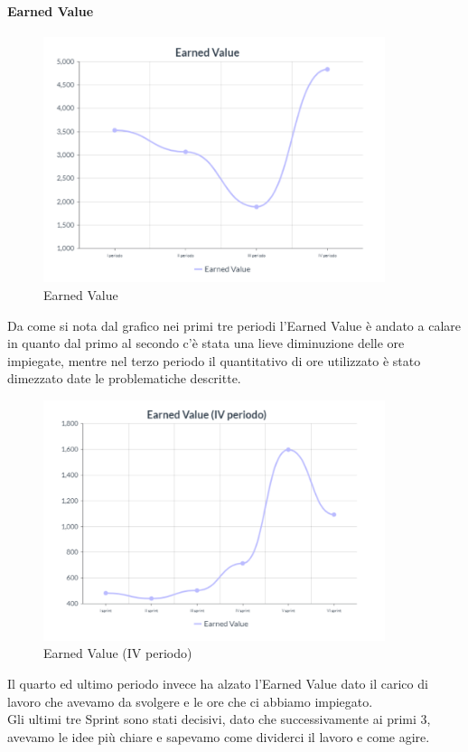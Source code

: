 \paragraph{Earned Value}
\begin{center}
\begin{figure}[H]
  \centering
  \renewcommand{\thefigure}{5}
  \includegraphics[width=10cm]{./res/images/EVGraph.png}
  \caption{Earned Value}
  \label{fig:Grafico Earned Value}
\end{figure}
\end{center}
Da come si nota dal grafico nei primi tre periodi l'Earned Value è andato a calare in quanto dal primo al secondo c'è stata una lieve diminuzione delle ore impiegate, mentre nel terzo periodo il quantitativo di ore utilizzato è stato dimezzato date le problematiche descritte.
\begin{center}
\begin{figure}[H]
  \centering
  \renewcommand{\thefigure}{6}
  \includegraphics[width=10cm]{./res/images/EVGraphSprint.png}
  \caption{Earned Value (IV periodo)}
  \label{fig:Grafico Earned Value (IV periodo)}
\end{figure}
\end{center}
Il quarto ed ultimo periodo invece ha alzato l'Earned Value dato il carico di lavoro che avevamo da svolgere e le ore che ci abbiamo impiegato.\\
Gli ultimi tre Sprint sono stati decisivi, dato che successivamente ai primi 3, avevamo le idee più chiare e sapevamo come dividerci il lavoro e come agire.
